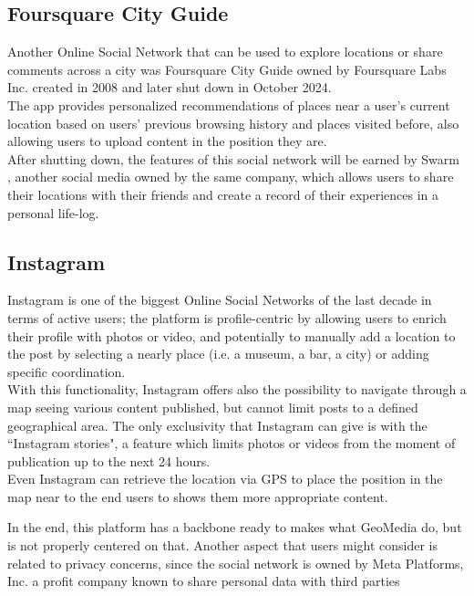 \documentclass[conference]{IEEEtran}
\begin{document}
\subsection{Foursquare City Guide}

Another Online Social Network that can be used to explore locations or share comments across a city was Foursquare City Guide\cite{FourSquareWiki} owned by Foursquare Labs Inc. \cite{FoursquareOfficialLink} created in 2008 and later shut down in October 2024.
\\
The app provides personalized recommendations of places near a user's current location based on users' previous browsing history and places visited before, also allowing users to upload content in the position they are.
\\
After shutting down, the features of this social network will be earned by Swarm \cite{FoursquareSwarm}, another social media owned by the same company, which allows users to share their locations with their friends and create a record of their experiences in a personal life-log.

\subsection{Instagram}
Instagram \cite{Instagram} is one of the biggest Online Social Networks of the last decade in terms of active users; the platform is profile-centric by allowing users to enrich their profile with photos or video, and potentially to manually add a location to the post by selecting a nearly place (i.e. a museum, a bar, a city) or adding specific coordination.
\\
With this functionality, Instagram offers also the possibility to navigate through a map seeing various content published, but cannot limit posts to a defined geographical area.
The only exclusivity that Instagram can give is with the ``Instagram stories", a feature which limits photos or videos from the moment of publication up to the next 24 hours.
\\
Even Instagram can retrieve the location via GPS to place the position in the map near to the end users to shows them more appropriate content.

In the end, this platform has a backbone ready to makes what GeoMedia do, but is not properly centered on that. Another aspect that users might consider is related to privacy concerns, since the social network is owned by Meta Platforms, Inc. a profit company known to share personal data with third parties\cite{MetaPrivacy}
\end{document}
